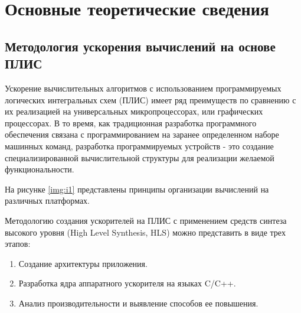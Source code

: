 \chapter{Основные теоретические сведения}

\section{Методология ускорения вычислений на основе ПЛИС}

Ускорение вычислительных алгоритмов с использованием программируемых логических интегральных схем (ПЛИС) имеет ряд преимуществ по сравнению с их реализацией на универсальных микропроцессорах, или графических процессорах. В то время, как традиционная разработка программного обеспечения связана с программированием на заранее определенном наборе машинных команд, разработка программируемых устройств - это создание специализированной вычислительной структуры для реализации желаемой функциональности.

На рисунке \ref{img:i1} представлены принципы организации вычислений на различных платформах.


Методологию создания ускорителей на ПЛИС с применением средств синтеза высокого уровня (High Level Synthesis, HLS) можно представить в виде трех этапов:
\begin{enumerate}
	\item Создание архитектуры приложения.
	\item Разработка ядра аппаратного ускорителя на языках C/C++.
	\item Анализ производительности и выявление способов ее повышения.
\end{enumerate}
